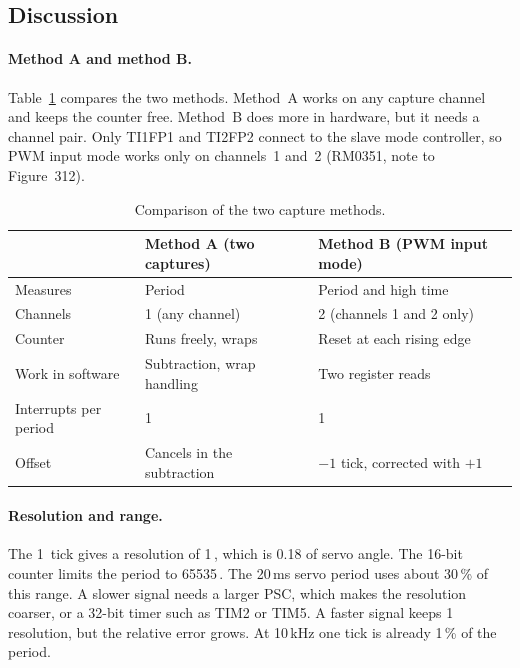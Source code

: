 \documentclass[11pt,a4paper]{article}
\newcommand{\us}{\,\text{\textmu s}}
\newcommand{\dg}{\text{\textdegree}}
\begin{document}
\subsection{Discussion}

\paragraph{Method A and method B.}
Table~\ref{tab:methods} compares the two methods. Method~A works on any
capture channel and keeps the counter free. Method~B does more in hardware,
but it needs a channel pair. Only TI1FP1 and TI2FP2 connect to the slave mode
controller, so PWM input mode works only on channels~1 and~2 (RM0351, note to
Figure~312).

\begin{table}[h]
\centering
\caption{Comparison of the two capture methods.}
\label{tab:methods}
\begin{tabular}{@{}lll@{}}
\toprule
 & Method A (two captures) & Method B (PWM input mode) \\
\midrule
Measures             & Period                      & Period and high time \\
Channels             & 1 (any channel)             & 2 (channels 1 and 2 only) \\
Counter              & Runs freely, wraps          & Reset at each rising edge \\
Work in software     & Subtraction, wrap handling  & Two register reads \\
Interrupts per period & 1                          & 1 \\
Offset               & Cancels in the subtraction  & $-1$ tick, corrected with $+1$ \\
\bottomrule
\end{tabular}
\end{table}

\paragraph{Resolution and range.}
The 1\us{} tick gives a resolution of 1\us, which is 0.18\dg{} of servo
angle. The 16-bit counter limits the period to 65535\us. The 20\,ms servo
period uses about 30\,\% of this range. A slower signal needs a larger PSC,
which makes the resolution coarser, or a 32-bit timer such as TIM2 or TIM5. A
faster signal keeps 1\us{} resolution, but the relative error grows. At 10\,kHz
one tick is already 1\,\% of the period.
\end{document}
